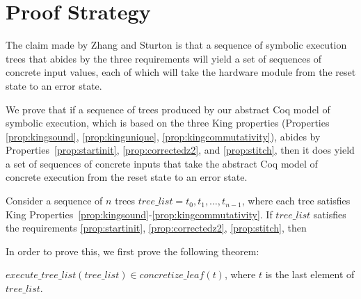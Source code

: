 \section{Proof Strategy}
The claim made by Zhang and Sturton is that a sequence of symbolic execution
trees that abides by the three requirements will yield a set of sequences of concrete
input values, each of which will take the hardware module from the reset state to an
error state.

We prove that if a sequence of trees produced by our abstract Coq model of symbolic
execution, which is based on the three King properties (Properties
\ref{prop:kingsound}, \ref{prop:kingunique}, \ref{prop:kingcommutativity}), abides by
Properties~\ref{prop:startinit}, \ref{prop:correctedz2}, and \ref{prop:stitch}, then
it does yield a set of sequences of concrete inputs that take the abstract Coq model of
concrete execution from the reset state to an error state.




\begin{theorem}
\label{thm:sufficiency} Consider a sequence of $n$ trees $\mathit{tree\_list} =
t_0, t_1, \ldots, t_{n-1}$, where each tree satisfies King
Properties~\ref{prop:kingsound}-\ref{prop:kingcommutativity}. If
$\mathit{tree\_list}$ satisfies the requirements \ref{prop:startinit},
\ref{prop:correctedz2}, \ref{prop:stitch}, then 
\end{theorem}
 
 In order to prove this, we first prove the following theorem:

\begin{theorem}
\label{thm:etl}
 $execute\_tree\_list (tree\_list) \in concretize\_leaf (t)$, where $t$ is the last element of $tree\_list$.
\end{theorem}

